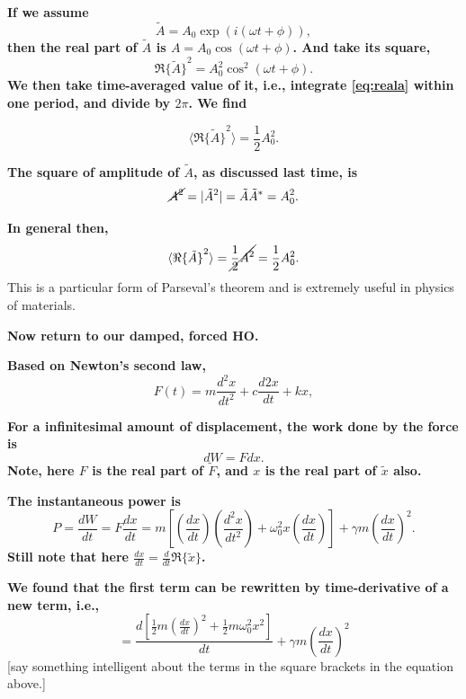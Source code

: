 \documentclass[]{revtex4}
\newcommand{\st}[1]{{\color{red}\bfseries #1}}
\begin{document}
\st{
If we assume 
\begin{equation*}
  \tilde{A} = A_0 \exp(i (\omega t + \phi)),
\end{equation*}
then the real part of $\tilde{A}$ is $A = A_0 \cos (\omega t + \phi)$. And take its square,
}
\[\Re{\{\tilde{A}\}}^2=A_0^2\cos^2(\omega t + \phi).\label{eq:reala}\]
\st{
We then take time-averaged value of it, i.e., integrate \eqref{eq:reala} within one
period, and divide by $2\pi$. We find
}

\[\langle \Re{\{\tilde{A}\}}^2 \rangle=\frac{1}{2}A_0^2.\]

\st{
The square of amplitude of $\tilde{A}$, as discussed last time, is
}
\[\cancel{A^2} = |\tilde{A}^2| = \tilde{A}\tilde{A}^\ast = A_0^2.\]

\st{In general then,}
\[\langle \Re{\{\tilde{A}\}}^2 \rangle = \cancel{\frac{1}{2} A^2} = \frac{1}{2} A_0^2.\]
This is a particular form of Parseval's theorem and is extremely useful in physics of materials.

\st{Now return to our damped, forced HO.}

\st{
Based on Newton's second law,
}
\[ F(t) = m \frac{d^2x}{dt^2}+c\frac{d2x}{dt}+ kx\label{eq:dkx},\]

\st{
For a infinitesimal amount of displacement, the work done by the force is
}
\[dW = F dx.\]
\st{
  Note, here $F$ is the real part of $\tilde{F}$, and $x$ is the real part of $\tilde{x}$
  also.
}

\st{
The instantaneous power is
}
\[P=\frac{dW}{dt} = F \frac{dx}{dt} = m\left[\left(\frac{dx}{dt}\right)\left(\frac{d^2x}{dt^2}\right)+\omega_0^2x\left(\frac{dx}{dt}\right)\right]+\gamma m\left(\frac{dx}{dt}\right)^2.\]
\st{
Still note that here $\frac{ dx }{ dt } = \frac{ d }{ dt } \Re{\{\tilde{x}\}}$.
}

\st{
We found that the first term can be rewritten by time-derivative of a new term, i.e.,
}
\[= \frac{d \left[\frac{1}{2}m\left(\frac{dx}{dt}\right)^2+\frac{1}{2}m\omega_0^2x^2\right]}{dt}+\gamma m\left(\frac{dx}{dt}\right)^2\]
[say something intelligent about the terms in the square brackets in the equation above.]
\end{document}
